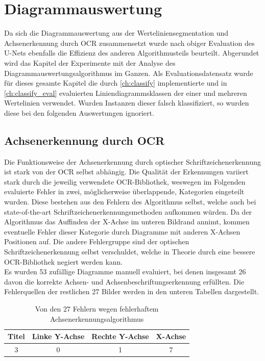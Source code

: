 \section{Diagrammauswertung}

Da sich die Diagrammauswertung aus der Werteliniensegmentation und Achsenerkennung durch OCR zusammensetzt wurde nach obiger Evaluation des U-Nets ebenfalls die Effizienz des anderen Algorithmusteils beurteilt. Abgerundet wird das Kapitel der Experimente mit der Analyse des Diagrammauswertungsalgorithmus im Ganzen. Als Evaluationsdatensatz wurde für dieses gesamte Kapitel die durch \ref{ch:classify} implementierte und in \ref{ch:classify_eval} evaluierten Liniendiagrammsklassen der einer und mehreren Wertelinien verwendet. Wurden  Instanzen dieser falsch klassifiziert, so wurden diese bei den folgenden Auswertungen ignoriert.

\subsection{Achsenerkennung durch OCR}
\label{ch:eval_ocr}

Die Funktionsweise der Achsenerkennung durch optischer Schriftzeichenerkennung ist stark von der OCR selbst abhängig. Die Qualität der Erkennungen variiert stark durch die jeweilig verwendete OCR-Bibliothek, weswegen im Folgenden evaluierte Fehler in zwei, möglicherweise überlappende, Kategorien eingeteilt wurden. Diese bestehen aus den Fehlern des Algorithmus selbst, welche auch bei state-of-the-art Schriftzeichenerkennungsmethoden aufkommen würden. Da der Algorithmus das Auffinden der X-Achse im unteren Bildrand annimt, kommen eventuelle Fehler dieser Kategorie durch Diagramme mit anderen X-Achsen Positionen auf. Die andere Fehlergruppe sind der optischen Schriftzeichenerkennung selbst verschuldet, welche in Theorie durch eine bessere OCR-Bibliothek negiert werden kann.
\\
Es wurden 53 zufällige Diagramme manuell evaluiert, bei denen insgesamt 26 davon die korrekte Achsen- und Achsenbeschriftungserkennung erfüllten. Die Fehlerquellen der restlichen 27 Bilder werden in den unteren Tabellen dargestellt.

\begin{table}[H]
    \centering
    \begin{tabular}{|c|c|c|c|}
        \hline
        \rowcolor[HTML]{EFEFEF}
        Titel & Linke Y-Achse & Rechte Y-Achse & X-Achse \\ \hline
        3     & 0             & 1              & 7       \\ \hline
    \end{tabular}
    \caption{Von den 27 Fehlern wegen fehlerhaftem Achsenerkennungsalgorithmus}
    \label{tb:ocr1}
\end{table}

